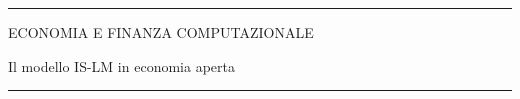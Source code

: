 \documentclass[12pt,aspectratio=169]{beamer}
\begin{document}
\begin{frame}
\unitlength 5mm

\begin{center}

\rule{\textwidth}{2pt}

\vskip3mm
ECONOMIA E FINANZA COMPUTAZIONALE

Il modello IS-LM in economia aperta

\rule{\textwidth}{2pt}

\end{center}

\end{frame}


\end{document}
